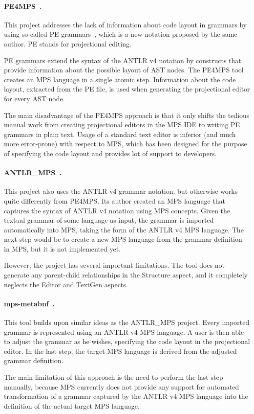 \paragraph{PE4MPS~\cite{ref:PE4MPS}.}
This project addresses the lack of information about code layout in grammars by using so called PE grammars~\cite{ref:PE}, which is a new notation proposed by the same author.
PE stands for projectional editing.

PE grammars extend the syntax of the ANTLR v4 notation by constructs that provide information about the possible layout of AST nodes.
The PE4MPS tool creates an MPS language in a single atomic step.
Information about the code layout, extracted from the PE file, is used when generating the projectional editor for every AST node.

The main disadvantage of the PE4MPS approach is that it only shifts the tedious manual work from creating projectional editors in the MPS IDE to writing PE grammars in plain text.
Usage of a standard text editor is inferior (and much more error-prone) with respect to MPS, which has been designed for the purpose of specifying the code layout and provides lot of support to developers.

\paragraph{ANTLR{\_}MPS~\cite{ref:ANTLR2MPS}.}
This project also uses the ANTLR v4 grammar notation, but otherwise works quite differently from PE4MPS.
Its author created an MPS language that captures the syntax of ANTLR v4 notation using MPS concepts.
Given the textual grammar of some language as input, the grammar is imported automatically into MPS, taking the form of the ANTLR v4 MPS language.
The next step would be to create a new MPS language from the grammar definition in MPS, but it is not implemented yet.

However, the project has several important limitations.
The tool does not generate any parent-child relationships in the Structure aspect, and it completely neglects the Editor and TextGen aspects.

\paragraph{mps-metabnf~\cite{ref:MPSMETABNF}.}
This tool builds upon similar ideas as the ANTLR{\_}MPS project.
Every imported grammar is represented using an ANTLR v4 MPS language.
A user is then able to adjust the grammar as he wishes, specifying the code layout in the projectional editor.
In the last step, the target MPS language is derived from the adjusted grammar definition.

The main limitation of this approach is the need to perform the last step manually, because MPS currently does not provide any support for automated transformation of a grammar captured by the ANTLR v4 MPS language into the definition of the actual target MPS language.

